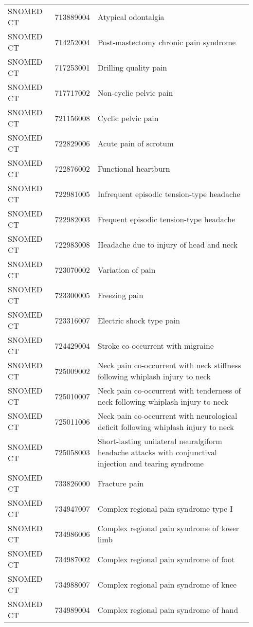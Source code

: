 \begin{longtable}{p{}p{}p{}}
  SNOMED CT & 713889004 & Atypical odontalgia \\ 
  SNOMED CT & 714252004 & Post-mastectomy chronic pain syndrome \\ 
  SNOMED CT & 717253001 & Drilling quality pain \\ 
  SNOMED CT & 717717002 & Non-cyclic pelvic pain \\ 
  SNOMED CT & 721156008 & Cyclic pelvic pain \\ 
  SNOMED CT & 722829006 & Acute pain of scrotum \\ 
  SNOMED CT & 722876002 & Functional heartburn \\ 
  SNOMED CT & 722981005 & Infrequent episodic tension-type headache \\ 
  SNOMED CT & 722982003 & Frequent episodic tension-type headache \\ 
  SNOMED CT & 722983008 & Headache due to injury of head and neck \\ 
  SNOMED CT & 723070002 & Variation of pain \\ 
  SNOMED CT & 723300005 & Freezing pain \\ 
  SNOMED CT & 723316007 & Electric shock type pain \\ 
  SNOMED CT & 724429004 & Stroke co-occurrent with migraine \\ 
  SNOMED CT & 725009002 & Neck pain co-occurrent with neck stiffness following whiplash injury to neck \\ 
  SNOMED CT & 725010007 & Neck pain co-occurrent with tenderness of neck following whiplash injury to neck \\ 
  SNOMED CT & 725011006 & Neck pain co-occurrent with neurological deficit following whiplash injury to neck \\ 
  SNOMED CT & 725058003 & Short-lasting unilateral neuralgiform headache attacks with conjunctival injection and tearing syndrome \\ 
  SNOMED CT & 733826000 & Fracture pain \\ 
  SNOMED CT & 734947007 & Complex regional pain syndrome type I \\ 
  SNOMED CT & 734986006 & Complex regional pain syndrome of lower limb \\ 
  SNOMED CT & 734987002 & Complex regional pain syndrome of foot \\ 
  SNOMED CT & 734988007 & Complex regional pain syndrome of knee \\ 
  SNOMED CT & 734989004 & Complex regional pain syndrome of hand \\ 

\end{longtable}
